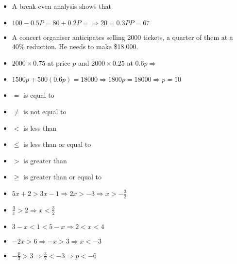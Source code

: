 \begin{frame}
\begin{itemize}
\item A break-even analysis shows that
\item $100 - 0.5P  =  80 + 0.2P = \Rightarrow 20  =  0.3P  P  =  67$
\end{itemize}
\end{frame}
\begin{frame}
\begin{itemize}
\item A concert organiser anticipates selling 2000 tickets, a quarter of them at a 40\% reduction. He needs to make \$18,000.
\item $2000 \times 0.75$ at price $p$ and $2000 \times 0.25$ at $0.6p \Rightarrow $
\item $1500p + 500(0.6p)  = 18000 \Rightarrow 1800p = 18000 \Rightarrow p = 10$
\end{itemize}
\end{frame}
\begin{frame}
\begin{itemize}
  \item $=$ is equal to
  \item $\neq$ is not equal to
  \item $<$ is less than
  \item $\le$  is less than or equal to
  \item $>$ is greater than
  \item $\ge$ is greater than or equal to
\end{itemize}
\end{frame}
\begin{frame}
\begin{itemize}
  \item $5x + 2 > 3x - 1 \Rightarrow 2x > -3 \Rightarrow x > - \frac{3}{2}$
  \item $\frac{3}{x} > 2 \Rightarrow x < \frac{3}{2}$
  \item $3 - x < 1 < 5 - x 	\Rightarrow  2 < x  < 4$
  \vspace*{.35cm}
  \item $-2x >  6	\Rightarrow -x > 3  \Rightarrow x < -3$
  \item $ -\frac{p}{2} > 3	\Rightarrow \frac{3}{2} < -3 \Rightarrow p < -6$
\end{itemize}
\end{frame}
